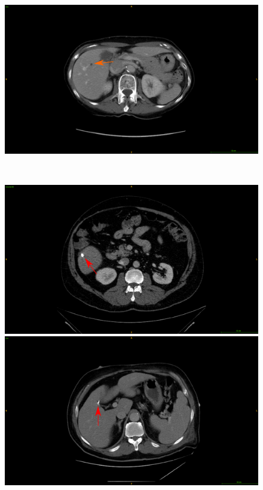 {\begin{figure}[!ht]
\begin{mdframed}[backgroundcolor=blue!50,linecolor=blue!50]
\begin{minipage}{0.45\linewidth}
		\end{minipage} \hspace{-0.1cm}
		\begin{minipage}{0.45\linewidth}
			\includegraphics[width=\linewidth]{images/Artifacts/TCIA_fat}
		\end{minipage} \\
		\begin{minipage}{0.45\linewidth}
			\includegraphics[width=\linewidth]{images/Artifacts/LITS_metallic_artifacts}
		\end{minipage} \hspace{-0.1cm}
		\begin{minipage}{0.45\linewidth}
			\includegraphics[width=\linewidth]{images/Artifacts/TCIA_metallic_artifacts}

\end{minipage}
\end{mdframed}
\end{figure}}
